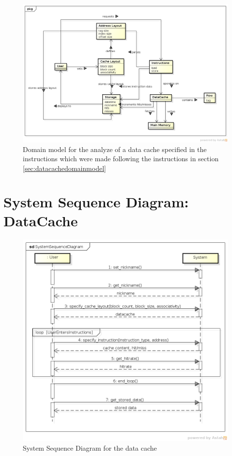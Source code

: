 \documentclass[a4paper]{scrreprt}
\begin{document}
\begin{figure}[h]
  \begin{center}
    \includegraphics[scale=.5]{DomainModel.png}
    \caption{Domain model for the analyze of a data cache specified in the instructions which were made following the instructions in section \ref{sec:datacachedomainmodel}}
    \label{fig:domainmodel}
  \end{center}
\end{figure}

\newpage

\section{System Sequence Diagram: DataCache}

\begin{figure}[h]
  \begin{center}
    \includegraphics[scale=.7]{SystemSequenceDiagram.png}
    \caption{System Sequence Diagram for the data cache}
    \label{fig:ssd}
  \end{center}
\end{figure}
\end{document}
